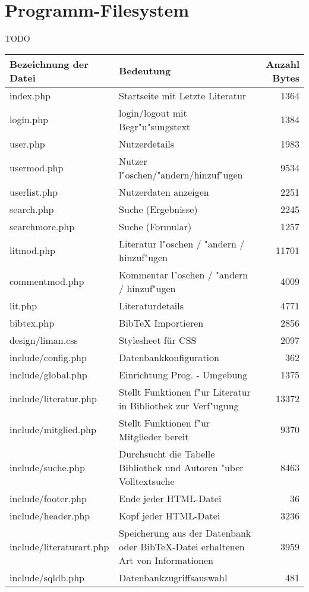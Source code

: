 \section{Programm-Filesystem}
{TODO}
\begin{longtable}{|l|p{6cm}|r|}
\hline
{\bf Bezeichnung der Datei} & {\bf Bedeutung} & {\bf Anzahl Bytes}\\
\hline\hline
\endhead

index.php & Startseite mit Letzte Literatur & 1364\\
\hline
login.php & login/logout mit Begr"u"sungstext & 1384\\
\hline
user.php & Nutzerdetails & 1983\\
\hline
usermod.php & Nutzer l"oschen/"andern/hinzuf"ugen & 9534\\
\hline
userlist.php & Nutzerdaten anzeigen & 2251\\
\hline
search.php & Suche (Ergebnisse) & 2245\\
\hline
searchmore.php & Suche (Formular) & 1257\\
\hline
litmod.php & Literatur l"oschen / "andern / hinzuf"ugen & 11701\\
\hline
commentmod.php & Kommentar l"oschen / "andern / hinzuf"ugen & 4009\\
\hline
lit.php & Literaturdetails & 4771\\
\hline
bibtex.php & BibTeX Importieren & 2856\\
\hline
design/liman.css & Stylesheet für CSS & 2097\\
\hline
include/config.php & Datenbankkonfiguration & 362\\
\hline
include/global.php & Einrichtung Prog. - Umgebung & 1375\\
\hline
include/literatur.php & Stellt Funktionen f"ur Literatur in Bibliothek zur Verf"ugung & 13372\\
\hline
include/mitglied.php & Stellt Funktionen f"ur Mitglieder bereit & 9370\\
\hline
include/suche.php & Durchsucht die Tabelle Bibliothek und Autoren "uber Volltextsuche & 8463\\
\hline
include/footer.php & Ende jeder HTML-Datei & 36 \\
\hline
include/header.php & Kopf jeder HTML-Datei & 3236 \\
\hline
include/literaturart.php & Speicherung aus der Datenbank oder BibTeX-Datei erhaltenen Art von Informationen & 3959\\
\hline
include/sqldb.php & Datenbankzugriffsauswahl & 481 \\

\end{longtable}
